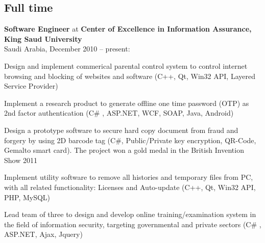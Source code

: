 \documentclass[letterpaper]{article}
\renewenvironment{itemize}{
  \begin{list}{}{
    \setlength{\leftmargin}{1.5em}
  }
}{
  \end{list}
}
\begin{document}
\subsection*{Full time}
\begin{itemize}
\item \textbf{Software Engineer} at \textbf{Center of Excellence in Information Assurance, King Saud University} \\ Saudi Arabia, December 2010 -- present:
\begin{itemize}
\item Design and implement commerical parental control system to control internet browsing and blocking of websites and software (C++, Qt, Win32 API, Layered Service Provider)
\item Implement a research product to generate offline one time password (OTP) as 2nd factor authentication (C\# , ASP.NET, WCF, SOAP, Java, Android)
\item Design a prototype software to secure hard copy document from fraud and forgery by using 2D barcode tag (C\#, Public/Private key encryption, QR-Code, Gemalto smart card). The project won a gold medal in the British Invention Show 2011 %
\item Implement utility software to remove all histories and temporary files from PC, with all related functionality: Licenses and Auto-update (C++, Qt, Win32 API, PHP, MySQL)
\item Lead team of three to design and develop online training/examination system in the field of information security, targeting governmental and private sectors (C\# , ASP.NET, Ajax, Jquery)
\end{itemize}

\end{itemize}
\end{document}
